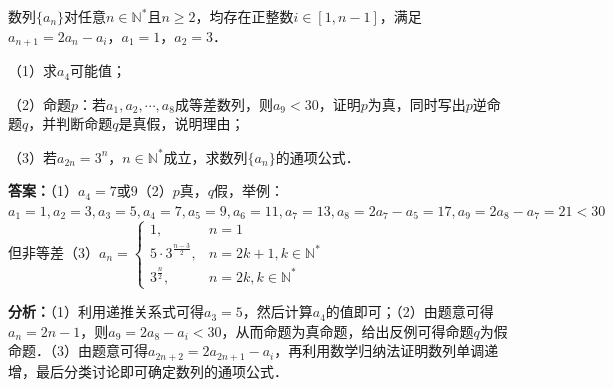 \begin{question}[points=18]
数列$\{a_n\}$对任意$n\in\mathbb{N}^*$且$n\geq 2$，均存在正整数$i\in[1,n-1]$，满足$a_{n+1}=2a_n-a_i$，$a_1=1$，$a_2=3$．

（1）求$a_4$可能值；

（2）命题$p$：若$a_1,a_2,\cdots,a_8$成等差数列，则$a_9<30$，证明$p$为真，同时写出$p$逆命题$q$，并判断命题$q$是真假，说明理由；

（3）若$a_{2n}=3^n$，$n\in\mathbb{N}^*$成立，求数列$\{a_n\}$的通项公式．
\begin{solution}
\textbf{答案：}（1）$a_4=7$或$9$（2）$p$真，$q$假，举例：$a_1=1,a_2=3,a_3=5,a_4=7,a_5=9,a_6=11,a_7=13,a_8=2a_7-a_5=17,a_9=2a_8-a_7=21<30$但非等差（3）$a_n=\begin{cases}1, & n=1\\5\cdot3^{\frac{n-3}{2}}, & n=2k+1,k\in\mathbb{N}^*\\3^{\frac{n}{2}}, & n=2k,k\in\mathbb{N}^*\end{cases}$

\textbf{分析：}（1）利用递推关系式可得$a_3=5$，然后计算$a_4$的值即可；（2）由题意可得$a_n=2n-1$，则$a_9=2a_8-a_i<30$，从而命题为真命题，给出反例可得命题$q$为假命题．（3）由题意可得$a_{2n+2}=2a_{2n+1}-a_i$，再利用数学归纳法证明数列单调递增，最后分类讨论即可确定数列的通项公式．


\end{solution}
\end{question}
